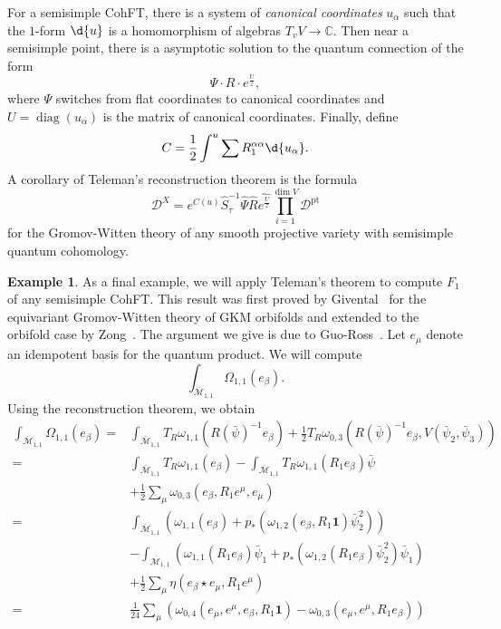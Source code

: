 \documentclass[10pt,oldfontcommands,oneside]{memoir}
\theoremstyle{definition}
\newtheorem{exm}[thm]{Example}
\theoremstyle{remark}
\theoremstyle{plain}
\theoremstyle{definition}
\theoremstyle{remark}
\newcommand{\C}{\mathbb{C}}
\newcommand{\Mbar}{\overline{\mathcal{M}}}
\newcommand{\mc}[1]{\mathcal{#1}}
\newcommand{\mr}[1]{\mathrm{#1}}
\newcommand{\on}[1]{\operatorname{#1}}
\newcommand{\wh}[1]{\widehat{#1}}
\newcommand{\1}{\mathbf{1}}
\newcommand{\2}{\mathbf{2}}
\newcommand{\3}{\mathbf{3}}
\begin{document}
For a semisimple CohFT, there is a system of \textit{canonical coordinates} $u_{\alpha}$ such that the $1$-form $\d{u}$ is a homomorphism of algebras $T_v V \to \C$. Then near a semisimple point, there is a asymptotic solution to the quantum connection of the form
\[ \Psi \cdot  R \cdot e^{\frac{U}{z}}, \]
where $\Psi$ switches from flat coordinates to canonical coordinates and $U = \on{diag}(u_{\alpha})$ is the matrix of canonical coordinates. Finally, define
\[ C = \frac{1}{2} \int^u \sum R_1^{\alpha\alpha} \d{u_{\alpha}}. \]
A corollary of Teleman's reconstruction theorem is the formula
\[ \mc{D}^X = e^{C(u)} \hat{S}^{-1}_{\tau} \hat{\Psi} \hat{R} \wh{e^{\frac{U}{z}}} \prod_{i=1}^{\dim V} \mc{D}^{\mr{pt}} \]
for the Gromov-Witten theory of any smooth projective variety with semisimple quantum cohomology.

\begin{exm}
    As a final example, we will apply Teleman's theorem to compute $F_1$ of any semisimple CohFT. This result was first proved by Givental~\cite{ellgwmirror} for the equivariant Gromov-Witten theory of GKM orbifolds and extended to the orbifold case by Zong~\cite{zythesis}. The argument we give is due to Guo-Ross~\cite{g1mslg}. Let $e_{\mu}$ denote an idempotent basis for the quantum product. We will compute
    \[ \int_{\Mbar_{1,1}} \Omega_{1,1}(e_{\beta}). \]
    Using the reconstruction theorem, we obtain
    \begin{align*}
        \int_{\Mbar_{1,1}}\Omega_{1,1}(e_{\beta}) ={}& \int_{\Mbar_{1,1}} T_R \omega_{1,1}(R(\bar{\psi})^{-1} e_{\beta}) + \frac{1}{2} T_R \omega_{0,3}(R(\bar{\psi})^{-1} e_{\beta}, V(\bar{\psi}_2, \bar{\psi}_3)) \\
        ={}& \int_{\Mbar_{1,1}}T_R\omega_{1,1}(e_{\beta}) - \int_{\Mbar_{1,1}} T_R \omega_{1,1}(R_1 e_{\beta})\bar{\psi} \\ 
        &+ \frac{1}{2}\sum_{\mu}  \omega_{0,3}(e_{\beta}, R_1 e^{\mu}, e_{\mu}) \\
        ={}& \int_{\Mbar_{1,1}} ( \omega_{1,1}(e_{\beta}) + p_* ( \omega_{1,2}(e_{\beta}, R_1 \1) \bar{\psi}_2^2 )) \\
        &- \int_{\Mbar_{1,1}} (\omega_{1,1}(R_1 e_{\beta})\bar{\psi}_1 + p_* ( \omega_{1,2}(R_1 e_{\beta}) \bar{\psi}_2^2 ) \bar{\psi}_1) \\
        &+ \frac{1}{2} \sum_{\mu} \eta(e_{\beta} \star e_{\mu}, R_1 e^{\mu}) \\
        ={}& \frac{1}{24} \sum_{\mu} ( \omega_{0,4}(e_{\mu}, e^{\mu}, e_{\beta}, R_1 \1) -\omega_{0,3}(e_{\mu}, e^{\mu}, R_1 e_{\beta}) )\\

\end{align*}
\end{exm}
\end{document}
